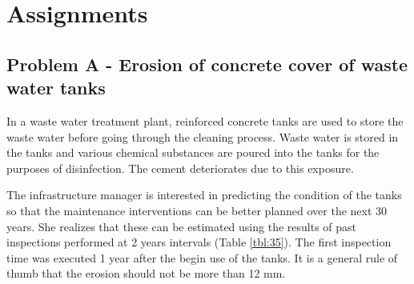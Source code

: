 \section{Assignments}
\subsection{Problem A - Erosion of concrete cover of waste water tanks}
In a waste water treatment plant, reinforced concrete tanks are used to store the waste water before going through the cleaning process. Waste water is stored in the tanks and various chemical substances are poured into the tanks for the purposes of disinfection. The cement deteriorates due to this exposure. 

The infrastructure manager is interested in predicting the condition of the tanks so that the maintenance interventions can be better planned over the next 30 years. She realizes that these can be estimated using the results of past inspections performed at 2 years intervals (Table \ref{tbl:35}). The first inspection time was executed 1 year after the begin use of the tanks. It is a general rule of thumb that the erosion should not be more than 12 mm.
%
